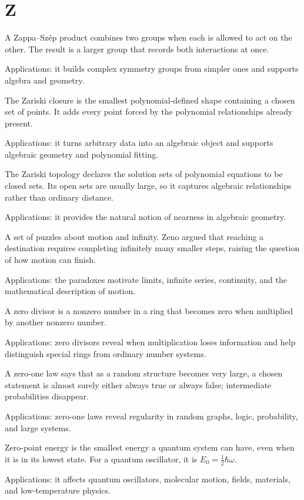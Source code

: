 \chapter*{Z}
\label{chap:z}

A Zappa--Szép product combines two groups when each is allowed to act on the other. The result is a larger group that records both interactions at once. \par\noindent Applications: it builds complex symmetry groups from simpler ones and supports algebra and geometry.

The Zariski closure is the smallest polynomial-defined shape containing a chosen set of points. It adds every point forced by the polynomial relationships already present. \par\noindent Applications: it turns arbitrary data into an algebraic object and supports algebraic geometry and polynomial fitting.

The Zariski topology declares the solution sets of polynomial equations to be closed sets. Its open sets are usually large, so it captures algebraic relationships rather than ordinary distance. \par\noindent Applications: it provides the natural notion of nearness in algebraic geometry.

A set of puzzles about motion and infinity. Zeno argued that reaching a destination requires completing infinitely many smaller steps, raising the question of how motion can finish. \par\noindent Applications: the paradoxes motivate limits, infinite series, continuity, and the mathematical description of motion.

A zero divisor is a nonzero number in a ring that becomes zero when multiplied by another nonzero number. \par\noindent Applications: zero divisors reveal when multiplication loses information and help distinguish special rings from ordinary number systems.

A zero-one law says that as a random structure becomes very large, a chosen statement is almost surely either always true or always false; intermediate probabilities disappear. \par\noindent Applications: zero-one laws reveal regularity in random graphs, logic, probability, and large systems.

Zero-point energy is the smallest energy a quantum system can have, even when it is in its lowest state. For a quantum oscillator, it is $E_0=\frac12\hbar\omega$. \par\noindent Applications: it affects quantum oscillators, molecular motion, fields, materials, and low-temperature physics.

